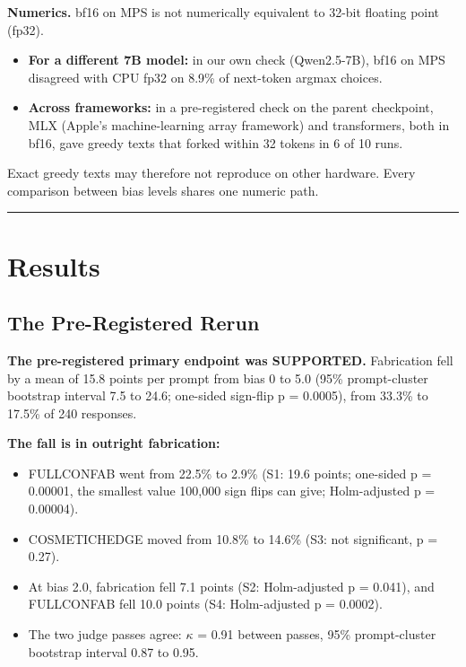 \documentclass[11pt,letterpaper]{article}
\providecommand{\tightlist}{\setlength{\itemsep}{0pt}\setlength{\parskip}{0pt}}
\DeclareRobustCommand{\_}{\textunderscore\allowbreak}
\begin{document}
\textbf{Numerics.} bf16 on MPS is not numerically equivalent to 32-bit floating point (fp32).

\begin{itemize}
\tightlist
\item
  \textbf{For a different 7B model:} in our own check (Qwen2.5-7B), bf16 on MPS disagreed with CPU fp32 on 8.9\% of next-token argmax choices.
\item
  \textbf{Across frameworks:} in a pre-registered check on the parent checkpoint, MLX (Apple's machine-learning array framework) and transformers, both in bf16, gave greedy texts that forked within 32 tokens in 6 of 10 runs.
\end{itemize}

Exact greedy texts may therefore not reproduce on other hardware. Every comparison between bias levels shares one numeric path.

\begin{center}\rule{0.5\linewidth}{0.5pt}\end{center}

\hypertarget{results}{%
\section{Results}\label{results}}

\hypertarget{the-pre-registered-rerun}{%
\subsection{The Pre-Registered Rerun}\label{the-pre-registered-rerun}}

\textbf{The pre-registered primary endpoint was SUPPORTED.} Fabrication fell by a mean of 15.8 points per prompt from bias 0 to 5.0 (95\% prompt-cluster bootstrap interval 7.5 to 24.6; one-sided sign-flip p = 0.0005), from 33.3\% to 17.5\% of 240 responses.

\textbf{The fall is in outright fabrication:}

\begin{itemize}
\tightlist
\item
  FULL\_CONFAB went from 22.5\% to 2.9\% (S1: 19.6 points; one-sided p = 0.00001, the smallest value 100,000 sign flips can give; Holm-adjusted p = 0.00004).
\item
  COSMETIC\_HEDGE moved from 10.8\% to 14.6\% (S3: not significant, p = 0.27).
\item
  At bias 2.0, fabrication fell 7.1 points (S2: Holm-adjusted p = 0.041), and FULL\_CONFAB fell 10.0 points (S4: Holm-adjusted p = 0.0002).
\item
  The two judge passes agree: \(\kappa\) = 0.91 between passes, 95\% prompt-cluster bootstrap interval 0.87 to 0.95.
\end{itemize}
\end{document}

